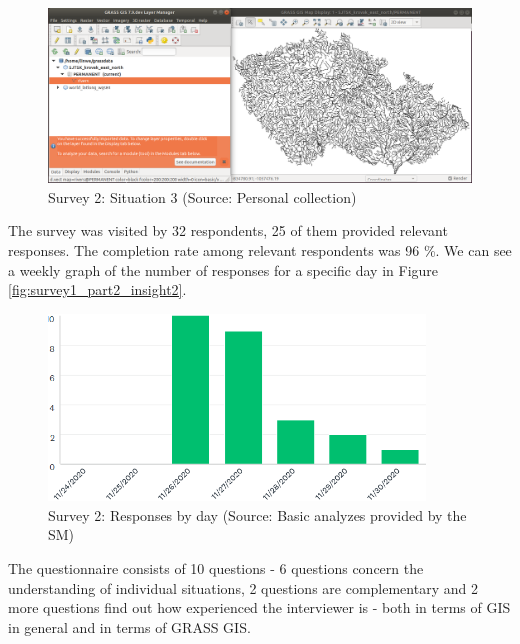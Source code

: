 \documentclass[a4paper,10pt,twoside]{article}
\begin{document}
\vspace{0.3cm}
\begin{figure}[hbt!] 
\begin{center}
\includegraphics[width=17cm]{../pictures/grass_infobar_3.png} 
\caption[Survey 2: Situation 3]{Survey 2: Situation 3 (Source: Personal collection)}
\label{fig:grass_infobar_3}
\end{center}
\end{figure}

\noindent The survey was visited by 32 respondents, 25 of them
provided relevant responses. The completion rate among relevant
respondents was 96 \%. We can see a weekly graph of the number of
responses for a specific day in Figure
\ref{fig:survey1_part2_insight2}.

\vspace{0.3cm}
\begin{figure}[hbt!] 
\begin{center}
\includegraphics[width=10cm]{../surveys/analyzed_data/survey2_insight2.png} 
\caption[Survey 2: Responses by day]{Survey 2: Responses by day (Source: Basic analyzes provided by the SM)}
\label{fig:survey2_insight2}
\end{center}
\end{figure}

\noindent The questionnaire consists of 10 questions - 6 questions
concern the understanding of individual situations, 2 questions are
complementary and 2 more questions find out how experienced the
interviewer is - both in terms of GIS in general and in terms of GRASS
GIS.
\end{document}
